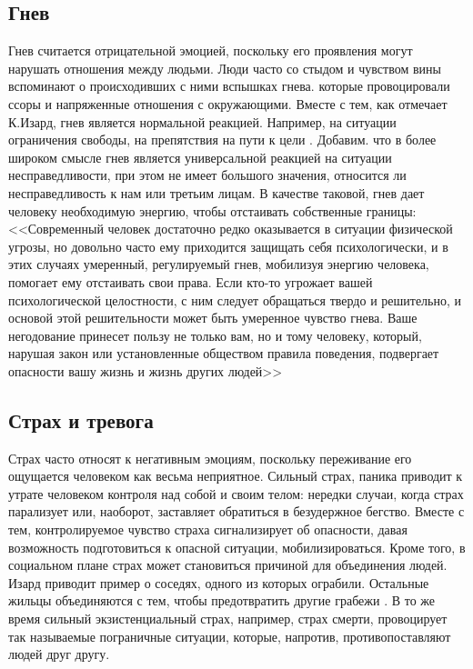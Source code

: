 \documentclass{../../common/thesisbyxetex}
\begin{document}
\subsection*{ Гнев}
Гнев считается отрицательной эмоцией, поскольку его проявления могут нарушать отношения между 
людьми. Люди часто со стыдом и чувством вины вспоминают о происходивших с ними вспышках гнева. 
которые провоцировали ссоры и напряженные отношения с окружающими. Вместе с тем, как отмечает 
К.Изард, гнев является нормальной реакцией. Например, на ситуации ограничения свободы, на 
препятствия 
на пути к цели \cite{izpsy}. Добавим. что в более широком смысле гнев является универсальной 
реакцией на ситуации несправедливости, при этом не имеет большого значения, относится ли 
несправедливость к нам или третьим лицам. В качестве таковой, гнев дает человеку необходимую 
энергию, чтобы отстаивать собственные границы: <<Современный человек достаточно редко оказывается в 
ситуации физической угрозы, но довольно часто ему приходится защищать себя психологически, и в этих 
случаях умеренный, регулируемый гнев, мобилизуя энергию человека, помогает ему отстаивать свои 
права. Если кто-то угрожает вашей психологической целостности, с ним следует обращаться твердо и 
решительно, и основой этой решительности может быть умеренное чувство гнева. Ваше негодование 
принесет пользу не только вам, но и тому человеку, который, нарушая закон или установленные 
обществом правила поведения, подвергает опасности вашу жизнь и жизнь других людей>> 
\cite[254]{izpsy}

\subsection*{ Страх и тревога}

Страх часто относят к негативным эмоциям, поскольку переживание его ощущается человеком как весьма 
неприятное. Сильный страх, паника приводит к утрате человеком контроля над собой и своим телом: 
нередки случаи, когда страх парализует или, наоборот, заставляет обратиться в безудержное бегство. 
Вместе с тем, контролируемое чувство страха сигнализирует об опасности, давая возможность 
подготовиться к опасной ситуации, мобилизироваться. Кроме того, в социальном плане страх может 
становиться причиной для объединения людей. Изард приводит пример о соседях, одного из которых 
ограбили. Остальные жильцы объединяются с тем, чтобы предотвратить другие грабежи \cite{izpsy}. В 
то же время сильный экзистенциальный страх, например, страх смерти, провоцирует так называемые 
пограничные ситуации, которые, напротив, противопоставляют людей друг другу.
\end{document}

